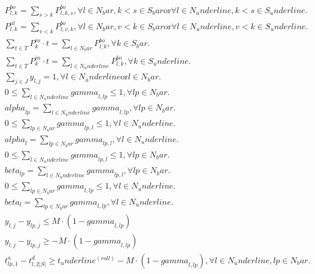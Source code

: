 \begin{align}
  & P_{l , k}^{b o} = \sum_{s > k} P_{l , k , s}^{b o} , \forall l \in N_bar , k < s \in S_bar \text{or} \forall l \in N_underline , k < s \in S_underline . \tag{eq\_0015} \\
  & P_{l , k}^{a l} = \sum_{v < k} P_{l , v , k}^{b o} , \forall l \in N_bar , v < k \in S_bar \text{or} \forall l \in N_underline , v < k \in S_underline . \tag{eq\_0016} \\
  & \sum_{t \in T} P_{k}^{i n} \cdot t = \sum_{l \in N_bar} P_{l , k}^{b o} , \forall k \in S_bar . \tag{eq\_0021} \\
  & \sum_{t \in T} P_{k}^{i n} \cdot t = \sum_{l \in N_underline} P_{l , k}^{b o} , \forall k \in S_underline . \tag{eq\_0022} \\
  & \sum_{j \in J} y_{l , j} = 1 , \forall l \in N_underline \text{or} l \in N_bar . \tag{eq\_0023} \\
  & 0 \leq \sum_{l \in N_underline} \mathit{gamma}_{l , lp} \leq 1 , \forall lp \in N_bar . \tag{eq\_0024} \\
  & \mathit{alpha}_{lp} = \sum_{l \in N_underline} \mathit{gamma}_{l , lp} , \forall lp \in N_bar . \tag{eq\_0025} \\
  & 0 \leq \sum_{lp \in N_bar} \mathit{gamma}_{lp , l} \leq 1 , \forall l \in N_underline . \tag{eq\_0026} \\
  & \mathit{alpha}_{l} = \sum_{lp \in N_bar} \mathit{gamma}_{lp , l} , \forall l \in N_underline . \tag{eq\_0027} \\
  & 0 \leq \sum_{l \in N_underline} \mathit{gamma}_{lp , l} \leq 1 , \forall lp \in N_bar . \tag{eq\_0028} \\
  & \mathit{beta}_{lp} = \sum_{l \in N_underline} \mathit{gamma}_{lp , l} , \forall lp \in N_bar . \tag{eq\_0029} \\
  & 0 \leq \sum_{lp \in N_bar} \mathit{gamma}_{l , lp} \leq 1 , \forall l \in N_underline . \tag{eq\_0030} \\
  & \mathit{beta}_{l} = \sum_{lp \in N_bar} \mathit{gamma}_{l , lp} , \forall l \in N_underline . \tag{eq\_0031} \\
  & y_{l , j} - y_{lp , j} \leq M \cdot \left(1 - \mathit{gamma}_{l , lp}\right) \tag{eq\_0032\_a} \\
  & y_{l , j} - y_{lp , j} \geq - M \cdot \left(1 - \mathit{gamma}_{l , lp}\right) \tag{eq\_0032\_b} \\
  & t_{lp , 1}^{a} - t_{l , 2 \left|S\right|}^{d} \geq t_underline^{\left(r o l l\right)} - M \cdot \left(1 - \mathit{gamma}_{l , lp}\right) , \forall l \in N_underline , lp \in N_bar . \tag{eq\_0034} \\

\end{align}
